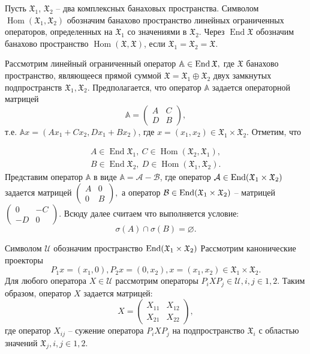 Пусть $\mathfrak{X}_1$, $\mathfrak{X}_2$ -- два комплексных банаховых пространства. Символом 
$\operatorname{Hom}(\mathfrak{X}_1, \mathfrak{X}_2)$ обозначим банахово пространство линейных ограниченных \\ операторов, определенных на $\mathfrak{X}_1$ со значениями в $\mathfrak{X}_2$. Через 
$\operatorname{End}\mathfrak{X}$ обозначим банахово пространство $\operatorname{Hom}(\mathfrak{X}, \mathfrak{X})$, 
если $\mathfrak{X}_1 = \mathfrak{X}_2 = \mathfrak{X}$.

Рассмотрим линейный ограниченный оператор $\mathbb{A} \in \operatorname{End}\mathfrak{X},$
где $\mathfrak{X}$ банахово пространство, являющееся прямой суммой 
$\mathfrak{X} = \mathfrak{X}_1 \oplus \mathfrak{X}_2$ двух замкнутых подпространств 
$\mathfrak{X}_1, \mathfrak{X}_2$. Предполагается, что оператор $\mathbb{A}$ задается операторной матрицей
$$
\mathbb{A} = \begin{pmatrix}
		A & C \\
		D & B
	\end{pmatrix},
$$
т.е. $\mathbb{A}x = (A x_1 + C x_2, D x_1 + B x_2)$, где $x = (x_1, x_2) \in \mathfrak{X}_1 \times \mathfrak{X}_2$. Отметим, что

\begin{align*}
A \in \operatorname{End}\mathfrak{X}_1, \ C \in \operatorname{Hom}(\mathfrak{X}_2, \mathfrak{X}_1), \\
B \in \operatorname{End}\mathfrak{X}_2, \ D \in \operatorname{Hom}(\mathfrak{X}_1, \mathfrak{X}_2).
\end{align*}
Представим оператор $\mathbb{A}$ в виде $\mathbb{A} = \mathcal{A} - \mathcal{B}$, где оператор 
$\mathcal{A} \in \operatorname{End}(\mathfrak{X}_1 \times \mathfrak{X}_2)$ задается матрицей 
$\begin{pmatrix}
		A & 0 \\
		0 & B
\end{pmatrix}, $ а оператор $\mathcal{B} \in \operatorname{End}(\mathfrak{X}_1 \times \mathfrak{X}_2)$ -- матрицей
$\begin{pmatrix}
		0 & -C \\
		-D & 0
\end{pmatrix}.$
Всюду далее считаем что выполняется условие:
$$
\sigma(A) \cap \sigma(B) = {\varnothing}.
$$

Символом $\mathcal{U}$ обозначим пространство $\operatorname{End}(\mathfrak{X}_1 \times \mathfrak{X}_2)$ Рассмотрим канонические проекторы
$$
P_1x = (x_1, 0), P_2x = (0, x_2), x = (x_1, x_2) \in \mathfrak{X}_1 \times \mathfrak{X}_2.
$$
Для любого оператора $X \in \mathcal{U}$ рассмотрим операторы $P_iXP_j \in \mathcal{U}, i,j \in {1,2}.$ Таким образом, оператор $X$ задается матрицей:
$$
X = \begin{pmatrix}
		X_{11} & X_{12} \\
		X_{21} & X_{22}
	\end{pmatrix},
$$
где оператор $X_{ij}$ -- сужение оператора $P_iXP_j$ на подпространство $\mathfrak{X}_i$ с областью значений $\mathfrak{X}_j, i,j \in {1,2}.$

